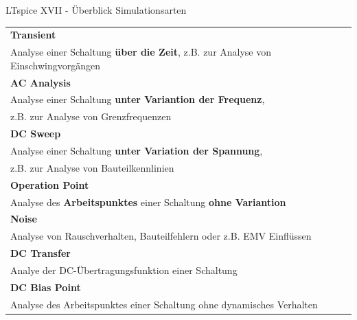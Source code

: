 \documentclass{beamer}
\begin{document}
\begin{frame}{LTspice XVII - Überblick Simulationsarten}

  \begin{scriptsize}
    \begin{tabular}{ l }
      \hline
      \textbf{Transient}                                                                       \\
      Analyse einer Schaltung \textbf{über die Zeit}, z.B. zur Analyse von Einschwingvorgängen \\
      \hline
      \textbf{AC Analysis}                                                                     \\
      Analyse einer Schaltung \textbf{unter Variantion der Frequenz},                          \\ z.B. zur Analyse von Grenzfrequenzen\\
      \hline
      \textbf{DC Sweep}                                                                        \\
      Analyse einer Schaltung \textbf{unter Variation der Spannung},                           \\ z.B. zur Analyse von Bauteilkennlinien\\
      \hline
      \textbf{Operation Point}                                                                 \\
      Analyse des \textbf{Arbeitspunktes} einer Schaltung \textbf{ohne Variantion}             \\
      \hline
      \textbf{Noise}                                                                           \\
      Analyse von Rauschverhalten, Bauteilfehlern oder z.B. EMV Einflüssen                     \\
      \hline
      \textbf{DC Transfer}                                                                     \\
      Analye der DC-Übertragungsfunktion einer Schaltung                                       \\
      \hline
      \textbf{DC Bias Point}                                                                   \\
      Analyse des Arbeitspunktes einer Schaltung ohne dynamisches Verhalten                    \\
      \hline
    \end{tabular}
  \end{scriptsize}

\end{frame}
\end{document}
